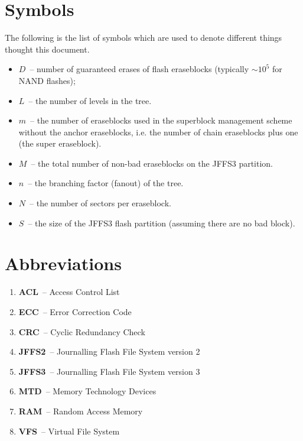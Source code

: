 \documentclass[12pt,a4paper,oneside,titlepage]{article}
\begin{document}
%
%
\section{Symbols} \label{ref_SectionSymbols}

The following is the list of symbols which are used to denote different things
thought this document.

\begin{itemize}

\item $D$~-- number of guaranteed erases of flash eraseblocks (typically
$\sim 10^5$ for NAND flashes);

\item $L$~-- the number of levels in the tree.

\item $m$~-- the number of eraseblocks used in the superblock management
scheme without the anchor eraseblocks, i.e. the number of chain eraseblocks
plus one (the super eraseblock).

\item $M$~-- the total number of non-bad eraseblocks on the JFFS3 partition.

\item $n$~-- the branching factor (fanout) of the tree.

\item $N$~-- the number of sectors per eraseblock.

\item $S$~-- the size of the JFFS3 flash partition (assuming there are no bad
block).

\end{itemize}

%
%
\section{Abbreviations}
\begin{enumerate}
\item \textbf{ACL}~-- Access Control List
\item \textbf{ECC}~-- Error Correction Code
\item \textbf{CRC}~-- Cyclic Redundancy Check
\item \textbf{JFFS2}~-- Journalling Flash File System version 2
\item \textbf{JFFS3}~-- Journalling Flash File System version 3
\item \textbf{MTD}~-- Memory Technology Devices
\item \textbf{RAM}~-- Random Access Memory
\item \textbf{VFS}~-- Virtual File System
\end{enumerate}
\end{document}
